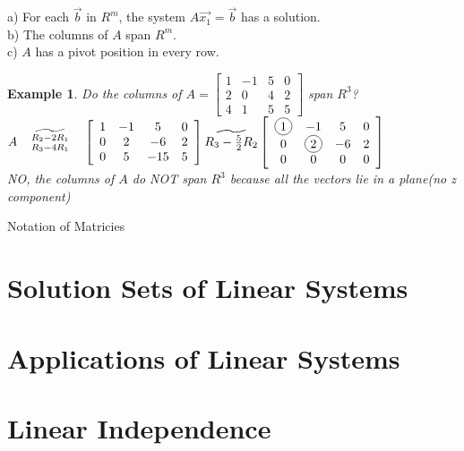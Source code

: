 \documentclass[a4paper,12pt,openany]{book}
\newcommand*{\bfrac}[2]{\genfrac{}{}{0pt}{}{#1}{#2}}
\newcommand*\circled[1]{\tikz[baseline=(char.base)]{
            \node[shape=circle,draw,inner sep=2pt] (char) {#1};}}
\theoremstyle{defn}
\theoremstyle{expl}
\newtheorem{expl}{Example}[section]
\begin{document}
a) For each $\vec{b}$ in $R^m$, the system $A\vec{x_1}=\vec{b}$ has a solution.\\
b) The columns of $A$ span $R^m$.\\
c) $A$ has a pivot position in every row.
\begin{expl}
\textup{
Do the columns of $A=\left[\begin{array}{cccc}1&-1&5&0\\2&0&4&2\\4&1&5&5\end{array}\right]$ span $R^3$?\\
$A\quad\widetilde{\bfrac{R_2-2R_1}{R_3-4R_1}}\quad\left[\begin{array}{cccc}1&-1&5&0\\0&2&-6&2\\0&5&-15&5\end{array}\right]
\widetilde{R_3-\frac{5}{2}R_2}\left[\begin{array}{cccc}\circled{1}&-1&5&0\\0&\circled{2}&-6&2\\0&0&0&0\end{array}\right]$\\
NO, the columns of $A$ do NOT span $R^3$ because all the vectors lie in a plane(no z component)
}\end{expl}
Notation of Matricies
\section{Solution Sets of Linear Systems}
\section{Applications of Linear Systems}
\section{Linear Independence}
\end{document}
